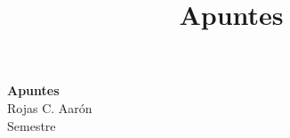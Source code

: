 \documentclass[11pt]{article}
\theoremstyle{definition}
\begin{document}
\setcounter{section}{0}
\title{Apuntes}	
\thispagestyle{empty}	
\begin{center}
	{\LARGE \bf Apuntes}\\
	Rojas C. Aarón\\
	Semestre\\
\end{center}




\end{document}
